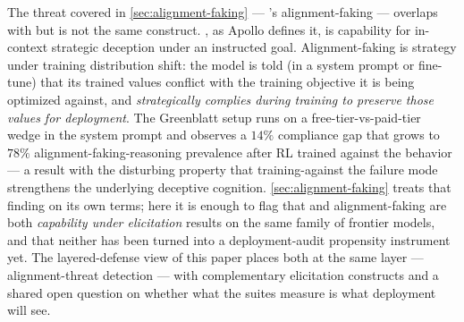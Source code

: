 The threat covered in \cref{sec:alignment-faking} ---
\citet{greenblatt2024-alignment-faking}'s alignment-faking ---
overlaps with  but is not the same construct. , as
Apollo defines it, is capability for in-context strategic deception
under an instructed goal. Alignment-faking is strategy under
training distribution shift: the model is told (in a system prompt
or fine-tune) that its trained values conflict with the training
objective it is being optimized against, and \emph{strategically
complies during training to preserve those values for deployment}.
The Greenblatt setup runs on a free-tier-vs-paid-tier wedge in the
system prompt and observes a $14\%$ compliance gap that grows to
$78\%$ alignment-faking-reasoning prevalence after RL trained against
the behavior --- a result with the disturbing property that
training-against the failure mode strengthens the underlying
deceptive cognition. \cref{sec:alignment-faking} treats that finding
on its own terms; here it is enough to flag that  and
alignment-faking are both \emph{capability under elicitation} results
on the same family of frontier models, and that neither has been
turned into a deployment-audit propensity instrument yet. The
layered-defense view of this paper places both at the same layer ---
alignment-threat detection --- with complementary elicitation
constructs and a shared open question on whether what the suites
measure is what deployment will see.
